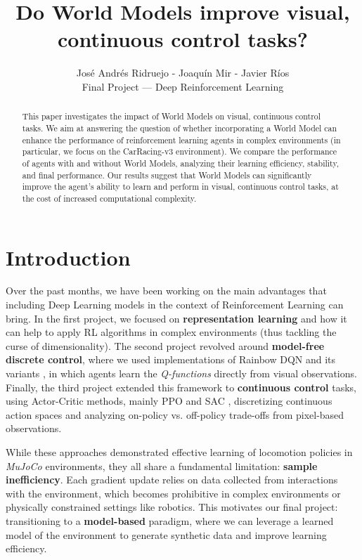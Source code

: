 \documentclass{article}
\title{Do World Models improve visual, continuous control tasks?}
\author{
José Andrés Ridruejo - Joaquín Mir - Javier Ríos \\
Final Project --- Deep Reinforcement Learning \\
}
\begin{document}
\maketitle

\begin{abstract}
    This paper investigates the impact of World Models on visual, continuous control tasks. We aim at answering the question of whether incorporating a World Model can enhance the performance of reinforcement learning agents in complex environments (in particular, we focus on the CarRacing-v3 environment). We compare the performance of agents with and without World Models, analyzing their learning efficiency, stability, and final performance. Our results suggest that World Models can significantly improve the agent's ability to learn and perform in visual, continuous control tasks, at the cost of increased computational complexity.
\end{abstract}

\section{Introduction}

Over the past months, we have been working on the main advantages that including Deep Learning models in the context of Reinforcement Learning can bring. In the first project, we focused on \textbf{representation learning} \cite{simclr} and how it can help to apply RL algorithms in complex environments (thus tackling the curse of dimensionality). The second project revolved around \textbf{model-free discrete control}, where we used implementations of Rainbow DQN and its variants \cite{rainbow2018combining}, in which agents learn the \textit{Q-functions} directly from visual observations. Finally, the third project extended this framework to \textbf{continuous control} tasks, using Actor-Critic methods, mainly PPO \cite{schulman2017proximal} and SAC \cite{haarnoja2018soft}, discretizing continuous action spaces and analyzing on-policy vs. off-policy trade-offs from pixel-based observations.

While these approaches demonstrated effective learning of locomotion policies in \textit{MuJoCo} environments, they all share a fundamental limitation: \textbf{sample inefficiency}. Each gradient update relies on data collected from interactions with the environment, which becomes prohibitive in complex environments or physically constrained settings like robotics. This motivates our final project: transitioning to a \textbf{model-based} paradigm, where we can leverage a learned model of the environment to generate synthetic data and improve learning efficiency.
\end{document}
